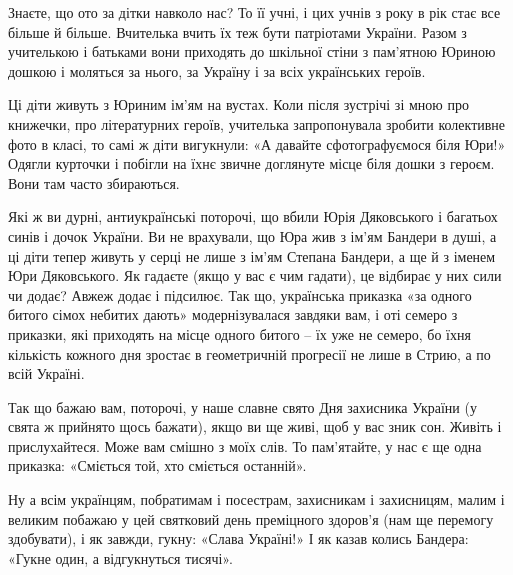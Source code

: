 Знаєте, що ото за дітки навколо нас? То її учні, і цих учнів з року в рік стає
все більше й більше. Вчителька вчить їх теж бути патріотами України. Разом з
учителькою і батьками вони приходять до шкільної стіни з пам’ятною Юриною
дошкою і моляться за нього, за Україну і за всіх українських героїв. 

Ці діти живуть з Юриним ім’ям на вустах. Коли після зустрічі зі мною про
книжечки, про літературних героїв, учителька запропонувала зробити колективне
фото в класі, то самі ж діти вигукнули: «А давайте сфотографуємося біля Юри!»
Одягли курточки і побігли на їхнє звичне доглянуте місце біля дошки з героєм.
Вони там часто збираються. 

Які ж ви дурні, антиукраїнські поторочі, що вбили Юрія Дяковського і багатьох
синів і дочок України. Ви не врахували, що Юра жив з ім’ям Бандери в душі, а ці
діти тепер живуть у серці не лише з ім’ям Степана Бандери, а ще й з іменем Юри
Дяковського. Як гадаєте (якщо у вас є чим гадати), це відбирає у них сили чи
додає? Авжеж додає і підсилює. Так що, українська приказка «за одного битого
сімох небитих дають» модернізувалася завдяки вам, і оті семеро з приказки, які
приходять на місце одного битого – їх уже не семеро, бо їхня кількість кожного
дня зростає в геометричній прогресії не лише в Стрию, а по всій  Україні.

Так що бажаю вам, поторочі, у наше славне свято Дня захисника України (у свята
ж прийнято щось бажати), якщо ви ще живі, щоб у вас зник сон. Живіть і
прислухайтеся. Може вам смішно з моїх слів. То пам’ятайте, у нас є ще одна
приказка: «Сміється той, хто сміється останній».

Ну а всім українцям, побратимам і посестрам, захисникам і захисницям, малим і
великим побажаю у цей святковий день преміцного здоров’я (нам ще перемогу
здобувати), і як завжди, гукну: «Слава Україні!» І як казав колись Бандера:
«Гукне один, а відгукнуться тисячі».

